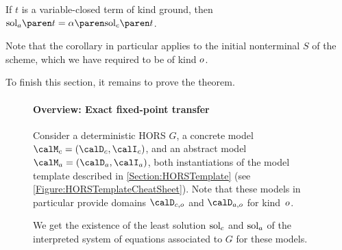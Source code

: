 \documentclass[../../diss.tex]{subfiles}
\begin{document}
\begin{corollary}%
\label{Corollary:HORSEFPT}%
    If $t$ is a variable-closed term of kind ground, then $\sola{t} = \abs{\solc{t}}$.
\end{corollary}

Note that the corollary in particular applies to the initial nonterminal $S$ of the scheme, which we have required to be of kind $o$.

To finish this section, it remains to prove the theorem.


\begin{figure}
    \onehalfspacing%
    {%
    \setlength{\fboxsep}{1em}
    \fbox%
    {%
        \begin{minipage}{\textwidth-2.5em}
            \vspace*{0.5em}
            \paragraph{\large Overview: Exact fixed-point transfer}
            \vspace{1em}
            Consider a deterministic HORS $G$, a concrete model $\modelc = (\domainc,\interpretationc)$, and an abstract model $\modela = (\domaina,\interpretationa)$, both instantiations of the model template described in \cref{Section:HORSTemplate} (see \cref{Figure:HORSTemplateCheatSheet}).
            Note that these models in particular provide domains $\domainc{\ground}$ and $\domaina{\ground}$ for kind~$o$.

            We get the existence of the least solution $\solc$ and $\sola$ of the interpreted system of equations associated to $G$ for these models.
            \vspace*{1em}

\end{minipage}}}
\end{figure}
\end{document}
